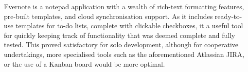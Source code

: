 Evernote is a notepad application with a wealth of rich-text formatting features, pre-built templates, and cloud synchronisation support. As it includes ready-to-use templates for to-do lists, complete with clickable checkboxes, it a useful tool for quickly keeping track of functionality that was deemed complete and fully tested. \cite{McCracken1} This proved satisfactory for solo development, although for cooperative undertakings, more specialised tools such as the aforementioned Atlassian JIRA, or the use of a Kanban board would be more optimal.